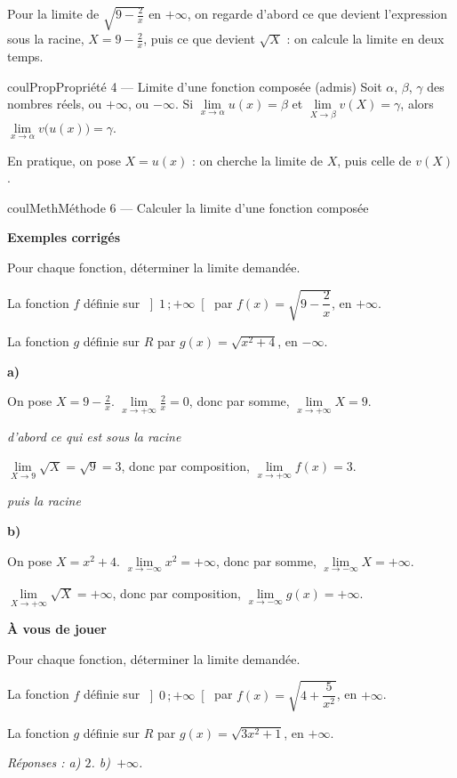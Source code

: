 \documentclass[11pt,a4paper]{article}
\makeatletter
\newcommand{\R}{\mathbb{R}}
\newcommand{\N}{\mathbb{N}}
\newcommand{\Z}{\mathbb{Z}}
\newcommand{\Q}{\mathbb{Q}}
\newcommand{\vect}[1]{\overrightarrow{#1}}
\newcommand{\fois}[1]{\times{\color{coulExo}#1}}
\newcommand{\lycee@intoo}[2]{\left]#1\,;#2\right[}
\providecommand{\Cf}{\mathcal{C}\sb{f}}%
\providecommand{\Cg}{\mathcal{C}\sb{g}}%
\providecommand{\intoo}{\lycee@intoo}%
\newcounter{lycee@signet}
\newcommand{\signet}[3][]{\stepcounter{lycee@signet}%
  \edef\lycee@dest{\if\relax\detokenize{#1}\relax
    signet.\arabic{lycee@signet}\else#1\fi}%
  \hypertarget{\lycee@dest}{}\bookmark[level=#2,dest=\lycee@dest]{#3}}
\def\R{R}\def\N{N}\def\Z{Z}\def\Q{Q}\def\vect#1{#1}\def\Cf{Cf}\def\Cg{Cg}\def\fois#1{×#1}%
\newcommand{\res}[1]{#1}
\newcounter{methode}
\newenvironment{proprietebox}[1][Propriété]%
  {\begin{boitecours}[phantom={\signet{2}{#1}}]{coulProp}{#1}}{\end{boitecours}}
\newenvironment{methodebox}[1][Méthode]{\stepcounter{methode}%
  \begin{boitecours}[phantom={\signet[methode-\arabic{methode}]{2}{#1}}]{coulMeth}{#1}}%
  {\end{boitecours}}
\newcommand{\etape}[1]{\par\smallskip\textbf{\color{coulMeth}#1}\par\nobreak\smallskip}
\newcommand{\reponse}[1]{\par\smallskip
  {\footnotesize\itshape\color{black!55}Réponses : #1}}
\newcommand{\explique}[2]{\par\smallskip\noindent
  \begin{minipage}[t]{0.57\linewidth}\raggedright #1\end{minipage}\hfill
  \begin{minipage}[t]{0.40\linewidth}\raggedright\leavevmode
    {\small\itshape\color{black!60}#2}\end{minipage}\par}
\newcommand{\cas}[1]{\par\smallskip\noindent\textbf{\color{coulExo}#1}\vadjust{\nobreak}}
\newenvironment{correction}{\par}{\par}
\newcommand{\etapeexemples}{\etape{Exemples corrigés}}
\makeatother
\begin{document}
Pour la limite de $\sqrt{9-\frac{2}{x}}$ en $+\infty$, on regarde d'abord ce que devient
l'expression sous la racine, $X=9-\frac{2}{x}$, puis ce que devient $\sqrt{X}$ : on
calcule la limite en deux temps.

\begin{proprietebox}[Propriété 4 --- Limite d'une fonction composée (admis)]
Soit $\alpha$, $\beta$, $\gamma$ des nombres réels, ou $+\infty$, ou $-\infty$. Si
$\lim\limits_{x\to\alpha}u(x)=\beta$ et $\lim\limits_{X\to\beta}v(X)=\gamma$, alors
$\lim\limits_{x\to\alpha}v\bigl(u(x)\bigr)=\gamma$.

\smallskip
En pratique, on pose $X=u(x)$ : on cherche la limite de $X$, puis celle de $v(X)$.
\end{proprietebox}

\begin{methodebox}[Méthode 6 --- Calculer la limite d'une fonction composée]
\etapeexemples
Pour chaque fonction, déterminer la limite demandée.
\begin{questions}[label=\alph*)]
  \item La fonction $f$ définie sur $\intoo{1}{+\infty}$ par $f(x)=\sqrt{9-\dfrac{2}{x}}$,
        en $+\infty$.
  \item La fonction $g$ définie sur $\R$ par $g(x)=\sqrt{x^{2}+4}$, en $-\infty$.
\end{questions}
\begin{correction}
\cas{a)}
\explique{On pose $X=9-\frac{2}{x}$. $\lim\limits_{x\to+\infty}\frac{2}{x}=0$, donc par
somme, $\lim\limits_{x\to+\infty}X=9$.}{d'abord ce qui est sous la racine}
\explique{$\lim\limits_{X\to 9}\sqrt{X}=\sqrt{9}=3$, donc par composition,
\res{$\lim\limits_{x\to+\infty}f(x)=3$}.}{puis la racine}
\cas{b)}
\explique{On pose $X=x^{2}+4$. $\lim\limits_{x\to-\infty}x^{2}=+\infty$, donc par somme,
$\lim\limits_{x\to-\infty}X=+\infty$.}{}
\explique{$\lim\limits_{X\to+\infty}\sqrt{X}=+\infty$, donc par composition,
\res{$\lim\limits_{x\to-\infty}g(x)=+\infty$}.}{}
\end{correction}

\etape{À vous de jouer}
Pour chaque fonction, déterminer la limite demandée.
\begin{questions}[label=\alph*)]
  \item La fonction $f$ définie sur $\intoo{0}{+\infty}$ par
        $f(x)=\sqrt{4+\dfrac{5}{x^{2}}}$, en $+\infty$.
  \item La fonction $g$ définie sur $\R$ par $g(x)=\sqrt{3x^{2}+1}$, en $+\infty$.
\end{questions}
\reponse{a) $2$.\; b)~$+\infty$.}
\end{methodebox}
\end{document}

